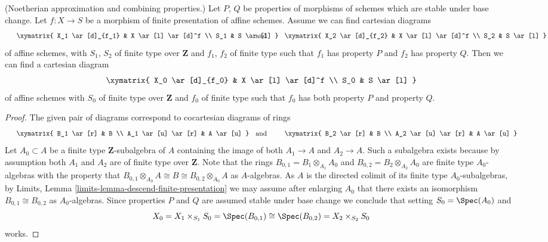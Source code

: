 \begin{lemma}
\label{lemma-Noetherian-approximation-combine}
(Noetherian approximation and combining properties.)
Let $P$, $Q$ be properties of morphisms of schemes which are stable
under base change. Let $f : X \to S$ be a morphism of finite presentation
of affine schemes. Assume we can find cartesian diagrams
$$
\vcenter{
\xymatrix{
X_1 \ar[d]_{f_1} & X \ar[l] \ar[d]^f \\
S_1 & S \ar[l]
}
}
\quad\text{and}\quad
\vcenter{
\xymatrix{
X_2 \ar[d]_{f_2} & X \ar[l] \ar[d]^f \\
S_2 & S \ar[l]
}
}
$$
of affine schemes, with $S_1$, $S_2$ of finite type over $\mathbf{Z}$
and $f_1$, $f_2$ of finite type such that $f_1$ has property $P$
and $f_2$ has property $Q$. Then we can find a cartesian diagram
$$
\xymatrix{
X_0 \ar[d]_{f_0} & X \ar[l] \ar[d]^f \\
S_0 & S \ar[l]
}
$$
of affine schemes with $S_0$ of finite type over $\mathbf{Z}$
and $f_0$ of finite type such that $f_0$ has both property $P$ and
property $Q$.
\end{lemma}

\begin{proof}
The given pair of diagrams correspond to cocartesian diagrams of rings
$$
\vcenter{
\xymatrix{
B_1 \ar[r] & B \\
A_1 \ar[u] \ar[r] & A \ar[u]
}
}
\quad\text{and}\quad
\vcenter{
\xymatrix{
B_2 \ar[r] & B \\
A_2 \ar[u] \ar[r] & A \ar[u]
}
}
$$
Let $A_0 \subset A$ be a finite type $\mathbf{Z}$-subalgebra of $A$
containing the image of both $A_1 \to A$ and $A_2 \to A$. Such a subalgebra
exists because by assumption both $A_1$ and $A_2$ are of finite type over
$\mathbf{Z}$. Note that the rings $B_{0, 1} = B_1 \otimes_{A_1} A_0$
and $B_{0, 2} = B_2 \otimes_{A_2} A_0$ are finite type $A_0$-algebras
with the property that
$B_{0, 1} \otimes_{A_0} A \cong B \cong B_{0, 2} \otimes_{A_0} A$
as $A$-algebras. As $A$ is the directed colimit of its finite type
$A_0$-subalgebras, by
Limits, Lemma \ref{limits-lemma-descend-finite-presentation}
we may assume after enlarging $A_0$ that there exists an isomorphism
$B_{0, 1} \cong B_{0, 2}$ as $A_0$-algebras. Since properties $P$ and $Q$
are assumed stable under base change we conclude that setting
$S_0 = \Spec(A_0)$ and
$$
X_0 = X_1 \times_{S_1} S_0 =
\Spec(B_{0, 1}) \cong \Spec(B_{0, 2}) = X_2 \times_{S_2} S_0
$$
works.
\end{proof}












